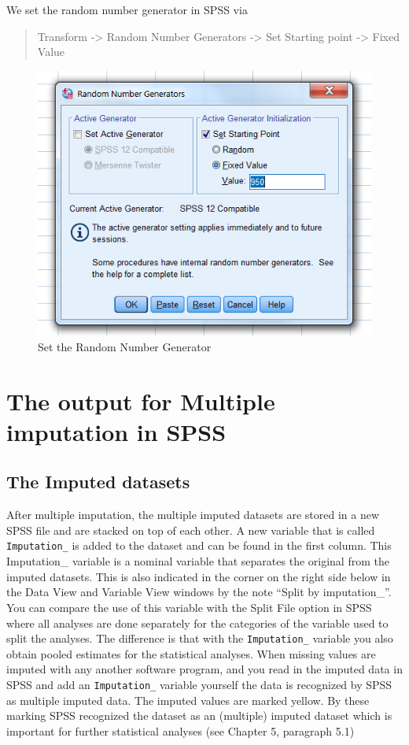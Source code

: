 \documentclass[]{book}
\begin{document}
We set the random number generator in SPSS via

\begin{quote}
Transform -\textgreater{} Random Number Generators -\textgreater{} Set
Starting point -\textgreater{} Fixed Value
\end{quote}

\begin{figure}

{\centering \includegraphics[width=0.7\linewidth]{images/fig4.5} 

}

\caption{Set the Random Number Generator }\label{fig:fig4-5}
\end{figure}

\section{The output for Multiple imputation in
SPSS}\label{the-output-for-multiple-imputation-in-spss}

\subsection{The Imputed datasets}\label{the-imputed-datasets}

After multiple imputation, the multiple imputed datasets are stored in a
new SPSS file and are stacked on top of each other. A new variable that
is called \texttt{Imputation\_} is added to the dataset and can be found
in the first column. This Imputation\_ variable is a nominal variable
that separates the original from the imputed datasets. This is also
indicated in the corner on the right side below in the Data View and
Variable View windows by the note ``Split by imputation\_''. You can
compare the use of this variable with the Split File option in SPSS
where all analyses are done separately for the categories of the
variable used to split the analyses. The difference is that with the
\texttt{Imputation\_} variable you also obtain pooled estimates for the
statistical analyses. When missing values are imputed with any another
software program, and you read in the imputed data in SPSS and add an
\texttt{Imputation\_} variable yourself the data is recognized by SPSS
as multiple imputed data. The imputed values are marked yellow. By these
marking SPSS recognized the dataset as an (multiple) imputed dataset
which is important for further statistical analyses (see Chapter 5,
paragraph 5.1)
\end{document}
